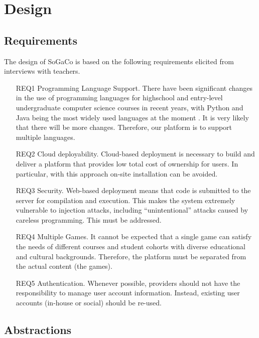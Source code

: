 \section{Design}

\subsection{Requirements}


The design of SoGaCo is based on the following requirements elicited from interviews with teachers.

\begin{itemize}
	
\item[REQ1] Programming Language Support. There have been significant changes in the use of programming languages for highschool and entry-level undergraduate computer science courses in recent years, with Python and Java being the most widely used languages at the moment \cite{guo2014python}. It is very likely that there will be more changes. Therefore, our platform is to support multiple languages.

\item[REQ2] Cloud deployability. Cloud-based deployment is necessary to build and deliver a platform that provides low total cost of ownership for users. In particular, with this approach on-site installation can be avoided.

\item[REQ3] Security. Web-based deployment means that code is submitted to the server for compilation and execution. This makes the system extremely vulnerable to injection attacks, including ``unintentional'' attacks caused by careless programming. This must be addressed.

\item[REQ4] Multiple Games. It cannot be expected that a single game can satisfy the needs of different courses and student cohorts with diverse educational and cultural backgrounds. Therefore, the platform must be separated from the actual content (the games).

\item[REQ5] Authentication. Whenever possible, providers should not have the responsibility to manage user account information. Instead, existing user accounts (in-house or social) should be re-used.

\end{itemize}


\subsection{Abstractions}


